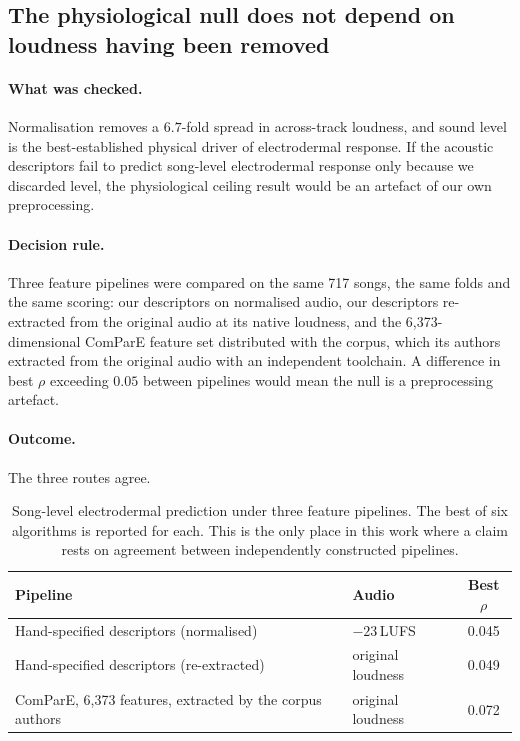 \subsection{The physiological null does not depend on loudness having been removed}

\paragraph{What was checked.}
Normalisation removes a $6.7$-fold spread in across-track loudness, and sound level is
the best-established physical driver of electrodermal response. If the acoustic
descriptors fail to predict song-level electrodermal response only because we
discarded level, the physiological ceiling result would be an artefact of our own
preprocessing.

\paragraph{Decision rule.}
Three feature pipelines were compared on the same 717 songs, the same folds and the
same scoring: our descriptors on normalised audio, our descriptors re-extracted from
the original audio at its native loudness, and the 6{,}373-dimensional ComParE feature
set distributed with the corpus, which its authors extracted from the original audio
with an independent toolchain. A difference in best $\rho$ exceeding $0.05$ between
pipelines would mean the null is a preprocessing artefact.

\paragraph{Outcome.}
The three routes agree.

\begin{table}[htbp]
\centering\small
\caption{Song-level electrodermal prediction under three feature pipelines. The best
of six algorithms is reported for each. This is the only place in this work where a
claim rests on agreement between independently constructed pipelines.}
\begin{tabular}{llc}
\toprule
Pipeline & Audio & Best $\rho$ \\
\midrule
Hand-specified descriptors (normalised)   & $-23$\,LUFS & 0.045 \\
Hand-specified descriptors (re-extracted) & original loudness & 0.049 \\
ComParE, 6{,}373 features, extracted by the corpus authors & original loudness & 0.072 \\
\bottomrule
\end{tabular}
\end{table}

